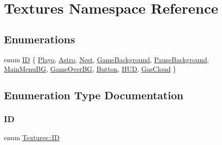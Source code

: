 \hypertarget{namespace_textures}{}\section{Textures Namespace Reference}
\label{namespace_textures}
\subsection*{Enumerations}
\begin{DoxyCompactItemize}
\item 
enum \hyperlink{namespace_textures_a2cfe2099537d4e80b08437b4978301a5}{ID} \{ \newline
\hyperlink{namespace_textures_a2cfe2099537d4e80b08437b4978301a5aa7eca1b35d39c70635eb67e8d21dc819}{Playo}, 
\hyperlink{namespace_textures_a2cfe2099537d4e80b08437b4978301a5a61cbf1132258cda586a6130a03e804c9}{Astro}, 
\hyperlink{namespace_textures_a2cfe2099537d4e80b08437b4978301a5ae0de724966274dc241ef3de7eadc396d}{Nest}, 
\hyperlink{namespace_textures_a2cfe2099537d4e80b08437b4978301a5a52aa97e3cdb226168982426b7ab0aa2d}{Game\+Background}, 
\newline
\hyperlink{namespace_textures_a2cfe2099537d4e80b08437b4978301a5aa39a5e3bca9832daaaa9cbf31b8961f9}{Pause\+Background}, 
\hyperlink{namespace_textures_a2cfe2099537d4e80b08437b4978301a5aa7d0eb38e6c55469c163efe01cb88695}{Main\+Menu\+BG}, 
\hyperlink{namespace_textures_a2cfe2099537d4e80b08437b4978301a5a24f167674de87c1108c92fffd3837cd0}{Game\+Over\+BG}, 
\hyperlink{namespace_textures_a2cfe2099537d4e80b08437b4978301a5ac583013e9c40cfacce00147270928966}{Button}, 
\newline
\hyperlink{namespace_textures_a2cfe2099537d4e80b08437b4978301a5a34760cfde35030b2a2e35c8e81d6602a}{H\+UD}, 
\hyperlink{namespace_textures_a2cfe2099537d4e80b08437b4978301a5aa9db10d857958d53d192c3165dead752}{Gas\+Cloud}
 \}
\end{DoxyCompactItemize}


\subsection{Enumeration Type Documentation}
\mbox{\label{namespace_textures_a2cfe2099537d4e80b08437b4978301a5}} 
\subsubsection{\texorpdfstring{ID}{ID}}
{\footnotesize\ttfamily enum \hyperlink{namespace_textures_a2cfe2099537d4e80b08437b4978301a5}{Textures\+::\+ID}}

